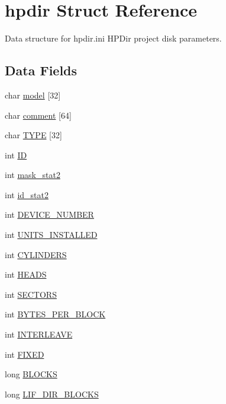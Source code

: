 \hypertarget{structhpdir}{}\section{hpdir Struct Reference}
\label{structhpdir}


Data structure for hpdir.\+ini H\+P\+Dir project disk parameters.  


\subsection*{Data Fields}
\begin{DoxyCompactItemize}
\item 
char \hyperlink{structhpdir_ae561ebb76038ed1dfe4b2511d445ad55}{model} \mbox{[}32\mbox{]}
\item 
char \hyperlink{structhpdir_a574c1602e6f78692be2ca81d26128e70}{comment} \mbox{[}64\mbox{]}
\item 
char \hyperlink{structhpdir_aee35438076503d0ae008b42cb02cb5f8}{T\+Y\+PE} \mbox{[}32\mbox{]}
\item 
int \hyperlink{structhpdir_a17f3f4abd99f31186f6b7e308e4f097c}{ID}
\item 
int \hyperlink{structhpdir_ae5df4f2faefc4eafab4d4f8f76174c65}{mask\+\_\+stat2}
\item 
int \hyperlink{structhpdir_a319e6d592ed85b0bdd369210b328a6f8}{id\+\_\+stat2}
\item 
int \hyperlink{structhpdir_a1e3e614e8f323bb5087945ba70beb16f}{D\+E\+V\+I\+C\+E\+\_\+\+N\+U\+M\+B\+ER}
\item 
int \hyperlink{structhpdir_ac7c95b0db81733f33d32228083a4fd2d}{U\+N\+I\+T\+S\+\_\+\+I\+N\+S\+T\+A\+L\+L\+ED}
\item 
int \hyperlink{structhpdir_a9d9c55a2ea7b79f47eb319c58e603f7f}{C\+Y\+L\+I\+N\+D\+E\+RS}
\item 
int \hyperlink{structhpdir_a7c12d4945c875e4830fe6197e6e9458b}{H\+E\+A\+DS}
\item 
int \hyperlink{structhpdir_aa2e7dc978d5e9323fc2de846070b2c14}{S\+E\+C\+T\+O\+RS}
\item 
int \hyperlink{structhpdir_a39c4462a29e33bb7c8712c3a4e4a2356}{B\+Y\+T\+E\+S\+\_\+\+P\+E\+R\+\_\+\+B\+L\+O\+CK}
\item 
int \hyperlink{structhpdir_a5fde4c6a05645b1cd7311eff6536b986}{I\+N\+T\+E\+R\+L\+E\+A\+VE}
\item 
int \hyperlink{structhpdir_ac3e0a6afce05a177e54f95b071924088}{F\+I\+X\+ED}
\item 
long \hyperlink{structhpdir_acf23c02ae0b762bebc9bea81618c4454}{B\+L\+O\+C\+KS}
\item 
long \hyperlink{structhpdir_ac66d8e5f5e632401c762a0698128dfdf}{L\+I\+F\+\_\+\+D\+I\+R\+\_\+\+B\+L\+O\+C\+KS}
\end{DoxyCompactItemize}


